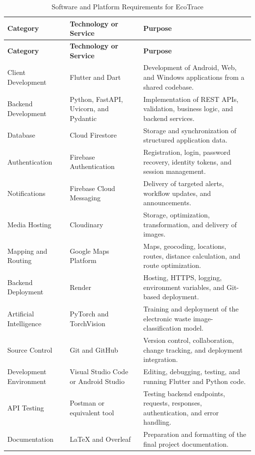 \begin{longtable}{@{}p{3cm}p{4cm}p{6.2cm}@{}}
\caption{Software and Platform Requirements for EcoTrace} \label{tab:sw-requirements} \\
\toprule \textbf{Category} & \textbf{Technology or Service} & \textbf{Purpose} \\ \midrule
\endfirsthead
\toprule \textbf{Category} & \textbf{Technology or Service} & \textbf{Purpose} \\ \midrule
\endhead
Client Development & Flutter and Dart & Development of Android, Web, and Windows applications from a shared codebase. \\
Backend Development & Python, FastAPI, Uvicorn, and Pydantic & Implementation of REST APIs, validation, business logic, and backend services. \\
Database & Cloud Firestore & Storage and synchronization of structured application data. \\
Authentication & Firebase Authentication & Registration, login, password recovery, identity tokens, and session management. \\
Notifications & Firebase Cloud Messaging & Delivery of targeted alerts, workflow updates, and announcements. \\
Media Hosting & Cloudinary & Storage, optimization, transformation, and delivery of images. \\
Mapping and Routing & Google Maps Platform & Maps, geocoding, locations, routes, distance calculation, and route optimization. \\
Backend Deployment & Render & Hosting, HTTPS, logging, environment variables, and Git-based deployment. \\
Artificial Intelligence & PyTorch and TorchVision & Training and deployment of the electronic waste image-classification model. \\
Source Control & Git and GitHub & Version control, collaboration, change tracking, and deployment integration. \\
Development Environment & Visual Studio Code or Android Studio & Editing, debugging, testing, and running Flutter and Python code. \\
API Testing & Postman or equivalent tool & Testing backend endpoints, requests, responses, authentication, and error handling. \\
Documentation & LaTeX and Overleaf & Preparation and formatting of the final project documentation. \\
\bottomrule
\end{longtable}

